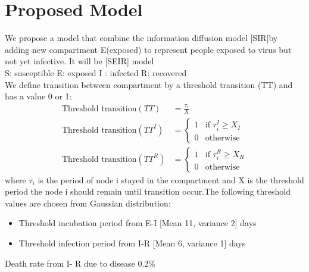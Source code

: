 \documentclass[conference]{IEEEtran}
\begin{document}
\section{Proposed Model} %
We propose a model that combine the information diffusion model [SIR]by adding new compartment E(exposed) to represent people exposed to virus but not yet infective. It will  be [SEIR] model\\
S: susceptible  E: exposed  I : infected  R: recovered\\
We define transition between compartment by a threshold transition (TT) and has a value 0 or 1:
\begin{align*}
    \text{Threshold transition}(TT) &= \frac{\tau_{i}}{X}\\
    \text{Threshold transition}(TT^{I}) &=%
    \begin{cases}
    1 &\text{if } \tau_{i}^{I} \geq X_{I}\\
    0 &\text{otherwise}
    \end{cases}\\
    \text{Threshold transition}(TT^{R}) &=%
    \begin{cases}
    1 &\text{if } \tau_{i}^{R} \geq X_{R}\\
    0 &\text{otherwise}
    \end{cases}
\end{align*}
where $\tau_{i}$ is the period of node i stayed in the compartment and X is the threshold period the node i should remain until transition occur.The following threshold values are chosen from Gaussian distribution:
\begin{itemize}
    \item Threshold incubation period from E-I  [Mean 11, variance 2] days
    \item Threshold infection period from I-R  [Mean 6, variance 1] days
\end{itemize}
Death rate from I- R  due to disease 0.2\%
\end{document}
